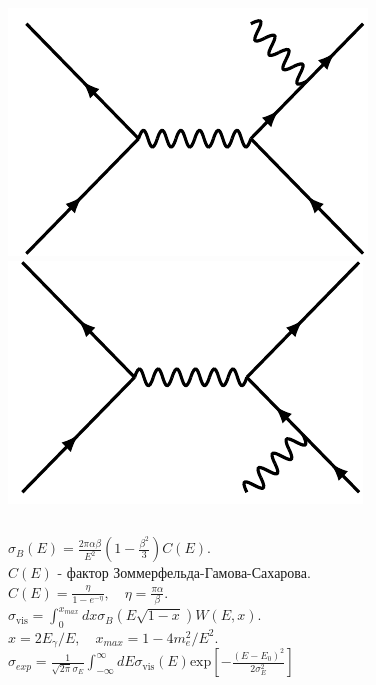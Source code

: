\documentclass[10pt, pdf, hyperref={unicode}]{beamer}
\begin{document}
\begin{frame}
\begin{minipage}{\linewidth}
\begin{columns}[T]
			\begin{column}{0.3\linewidth}
				\includegraphics[width = 0.8\linewidth]{diagram7.png}
				\vspace{10pt}
				\includegraphics[width = 0.8\linewidth]{diagram8.png}
			\end{column}
		\end{columns}
	\end{minipage}
\end{frame}

\begin{frame}
	\fontsize{12pt}{30}\selectfont
$\sigma_B(E) = \frac{2\pi\alpha\beta}{E^2}(1 - \frac{\beta^2}{3})C(E).$\\
				
$C(E)$ - фактор Зоммерфельда-Гамова-Сахарова.\\
		
$C(E) = \frac{\eta}{1 - e^{-\eta}}, \quad \eta = \frac{\pi\alpha}{\beta}.$\\
	
$\sigma_{\text{vis}} = \displaystyle \int_0^{x_{max}} dx \sigma_B(E\sqrt{1 - x})W(E, x).$\\ 
				
$x = 2E_{\gamma}/E, \quad x_{max} = 1 - 4m_e^2/E^2.$\\
				
$\sigma_{exp} = 
\frac{1}{\sqrt{2\pi}\sigma_E}\displaystyle \int_{-\infty}^{\infty} dE \sigma_{\text{vis}}(E)\text{exp}\left[-\frac{(E - E_0)^2}{2\sigma_E^2}\right]$
\end{frame}
\end{document}
